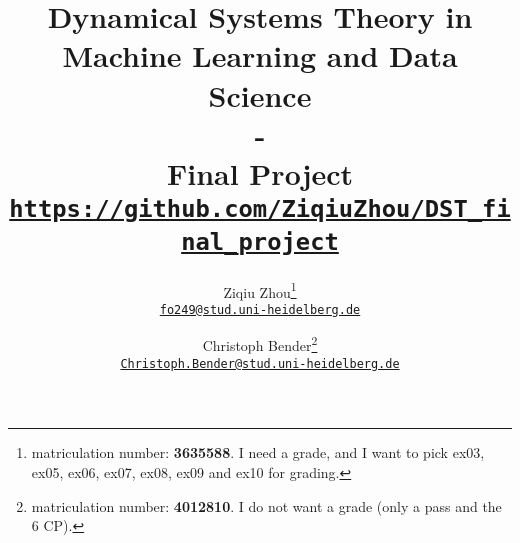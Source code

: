 \documentclass{scrarticle}
\title{\Huge Dynamical Systems Theory in Machine Learning and	Data Science\\\huge - \\Final Project\\\vspace{1cm}\normalsize\texttt{\url{https://github.com/ZiqiuZhou/DST_final_project}}}
\author{Ziqiu Zhou\footnote{matriculation number: \textbf{3635588}. I need a grade, and I want to pick ex03, ex05, ex06, ex07, ex08, ex09 and ex10 for grading.}\\\small \href{mailto:fo249@stud.uni-heidelberg.de}{\texttt{fo249@stud.uni-heidelberg.de}} \and  Christoph Bender\footnote{matriculation number: \textbf{4012810}. I do not want a grade (only a pass and the 6 CP).}\\\small \href{mailto:Christoph.Bender@stud.uni-heidelberg.de}{\texttt{Christoph.Bender@stud.uni-heidelberg.de}}}
\begin{document}
	\maketitle
	
	\clearpage
	
	\FloatBarrier
	
	\FloatBarrier
	
	\FloatBarrier
	\printbibliography
\end{document}
